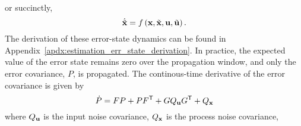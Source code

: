 or succinctly,
\begin{equation}
  \dot{\tilde{\mathrm{\mathbf{x}}}} = f\left(\mathrm{\mathbf{x}}, \tilde{\mathrm{\mathbf{x}}}, \mathrm{\mathbf{u}}, \tilde{\mathrm{\mathbf{u}}}\right).
\end{equation}
The derivation of these error-state dynamics can be found in
Appendix~\ref{apdx:estimation_err_state_derivation}. In practice, the expected
value of the error state remains zero over the propagation window, and only the
error covariance, $P$, is propagated.
The continous-time derivative of the error covariance is given by
\begin{equation}
  \dot{P} = FP + PF^{\mathsf{T}} + G Q_{\mathrm{\mathbf{u}}} G^{\mathsf{T}} + Q_{\mathrm{\mathbf{x}}}
\end{equation}
where $Q_{\mathrm{\mathbf{u}}}$ is the input noise covariance, $Q_{\mathrm{\mathbf{x}}}$ is the
process noise covariance,
